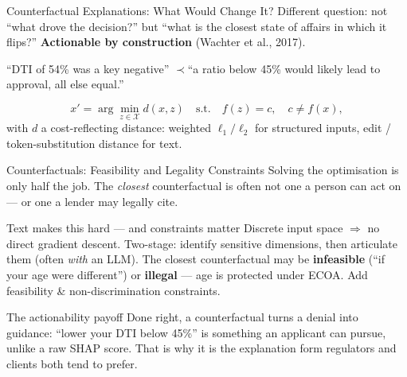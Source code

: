 \documentclass[9pt,t]{beamer}
\begin{document}
\begin{frame}{Counterfactual Explanations: What Would Change It?}
Different question: not ``what drove the decision?'' but ``what is the closest
state of affairs in which it flips?'' \textbf{Actionable by construction}
(Wachter et al., 2017).

\medskip
``DTI of 54\% was a key negative'' \quad$\prec$\quad ``a ratio below 45\% would
likely lead to approval, all else equal.''

\begin{underhood}
\[
x' = \arg\min_{z \in \mathcal{X}} d(x,z)\quad\text{s.t.}\quad f(z)=c,\quad c \ne f(x),
\]
with $d$ a cost-reflecting distance: weighted $\ell_1/\ell_2$ for structured
inputs, edit / token-substitution distance for text.
\end{underhood}
\end{frame}

\begin{frame}{Counterfactuals: Feasibility and Legality Constraints}
Solving the optimisation is only half the job. The \emph{closest} counterfactual
is often not one a person can act on --- or one a lender may legally cite.

\medskip
\begin{block}{Text makes this hard --- and constraints matter}
Discrete input space $\Rightarrow$ no direct gradient descent. Two-stage:
identify sensitive dimensions, then articulate them (often \emph{with} an LLM).
The closest counterfactual may be \textbf{infeasible} (``if your age were
different'') or \textbf{illegal} --- age is protected under ECOA. Add feasibility
\& non-discrimination constraints.
\end{block}

\medskip
\begin{alertblock}{The actionability payoff}
Done right, a counterfactual turns a denial into guidance: ``lower your DTI below
45\%'' is something an applicant can pursue, unlike a raw SHAP score. That is why
it is the explanation form regulators and clients both tend to prefer.
\end{alertblock}
\end{frame}
\end{document}
